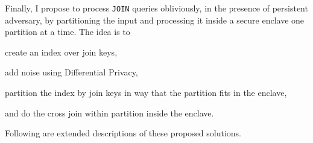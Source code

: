 		Finally, I propose to process \texttt{JOIN} queries obliviously, in the presence of persistent adversary, by partitioning the input and processing it inside a secure enclave one partition at a time.
		The idea is to
		\begin{enumerate*}[label=(\roman*)] %
			\item create an index over join keys,
			\item add noise using Differential Privacy,
			\item partition the index by join keys in way that the partition fits in the enclave,
			\item and do the cross join within partition inside the enclave.
		\end{enumerate*}

	Following are extended descriptions of these proposed solutions.
